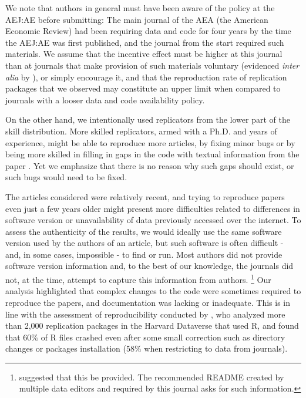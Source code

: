 We note that authors in general must have been aware of the policy at the AEJ:AE before submitting: The main journal of the AEA (the American Economic Review) had been requiring data and code for four years by the time the \ac{AEJ:AE} was first published, and the journal from the start required such materials. We  assume that the incentive effect must be higher at this journal than at journals that make provision of such materials voluntary (evidenced \textit{inter alia} by \textcite{greiner2023}), or simply encourage it, and that the reproduction rate of replication packages that we observed may constitute an upper limit when compared to journals with a looser data and code availability policy.

On the other hand, we intentionally used replicators from the lower part of the skill distribution. More skilled replicators, armed with a Ph.D. and years of experience, might be able to reproduce more articles, by fixing minor bugs or by being more skilled in filling in gaps in the code with textual information from the paper \parencite[see ][]{greiner2023}. Yet we emphasize that there is no reason why such gaps should exist, or such bugs would need to be fixed. 

The articles considered were relatively recent, and trying to reproduce papers even just a few years older might present more difficulties related to differences in software version or unavailability of data previously accessed over the internet. To assess the authenticity of the results, we would ideally use the same software version used by the authors of an article, but such software is often difficult - and, in some cases, impossible - to find or run. Most authors did not provide software version information and, to the best of our knowledge, the journals did not, at the time, attempt to capture this information from authors.%
\footnote{\textcite{McCullough2006} suggested that this be provided. The recommended README created by multiple data editors \parencite{templateREADMEv1.0,templateREADMEv1.1} and required by this journal asks for such information.}
Our analysis highlighted that complex changes to the code were sometimes required to reproduce the papers, and documentation was lacking or inadequate. This is in line with the assessment of reproducibility conducted by \textcite{trisovic2021}, who analyzed more than 2,000 replication packages in the Harvard Dataverse that used R, and found that 60$\%$ of R files crashed even after some small correction such as directory changes or packages installation (58$\%$ when restricting to data from journals). 
%
%

